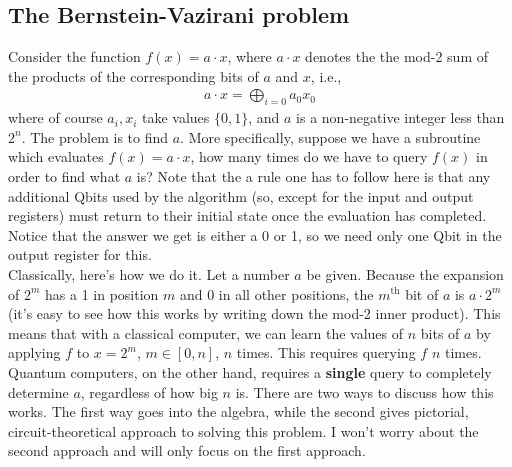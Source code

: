 \documentclass{book}
\theoremstyle{definition}
\begin{document}
\subsection{The Bernstein-Vazirani problem}

Consider the function $f(x) = a \cdot x$, where $a\cdot x$ denotes the the mod-2 sum of the products of the corresponding bits of $a$ and $x$, i.e., 
\begin{align}
a\cdot x = \bigoplus_{i=0} a_0 x_0
\end{align}
where of course $a_i, x_i$ take values $\{ 0,1\}$, and $a$ is a non-negative integer less than $2^n$. The problem is to find $a$. More specifically, suppose we have a subroutine which evaluates $f(x) = a\cdot x$, how many times do we have to query $f(x)$ in order to find what $a$ is? Note that the a rule one has to follow here is that any additional Qbits used by the algorithm (so, except for the input and output registers) must return to their initial state once the evaluation has completed. Notice that the answer we get is either a 0 or 1, so we need only one Qbit in the output register for this.  \\

Classically, here's how we do it. Let a number $a$ be given. Because the expansion of $2^m$ has a 1 in position $m$ and 0 in all other positions, the $m^{\text{th}}$ bit of $a$ is $a\cdot 2^m$ (it's easy to see how this works by writing down the mod-2 inner product).  This means that with a classical computer, we can learn the values of $n$ bits of $a$ by applying $f$ to $x = 2^m$, $m \in [0,n]$, $n$ times.  This requires querying $f$ $n$ times. \\

Quantum computers, on the other hand, requires a \textbf{single} query to completely determine $a$, regardless of how big $n$ is. There are two ways to discuss how this works. The first way goes into the algebra, while the second gives pictorial, circuit-theoretical approach to solving this problem. I won't worry about the second approach and will only focus on the first approach. \\
\end{document}
